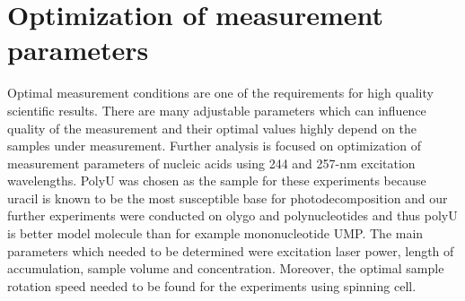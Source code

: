 \section{Optimization of measurement parameters}

Optimal measurement conditions are one of the requirements for high quality
scientific results. There are many adjustable parameters which can influence
quality of the measurement and their optimal values highly depend on the
samples under measurement. Further analysis is focused on optimization of
measurement parameters of nucleic acids using 244 and 257-nm excitation
wavelengths. PolyU was chosen as the sample for these experiments because
uracil is known to be the most susceptible base for photodecomposition and our
further experiments were conducted on olygo and polynucleotides and thus polyU
is better model molecule than for example mononucleotide UMP. The main
parameters which needed to be determined were excitation laser power, length of
accumulation, sample volume and concentration. Moreover, the optimal sample
rotation speed needed to be found for the experiments using spinning cell.







